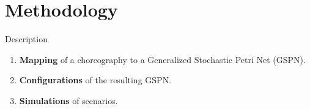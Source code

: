\documentclass[xcolor=svgnames]{beamer}
\begin{document}
\section{Methodology}
  \begin{frame}{Description}
    \begin{enumerate}
      \item <1-> \textbf{Mapping} of a choreography to a Generalized Stochastic Petri Net (GSPN).

      \item <2-> \textbf{Configurations} of the resulting GSPN.
      \item <3-> \textbf{Simulations} of scenarios.
    \end{enumerate}

  \end{frame}
\end{document}

